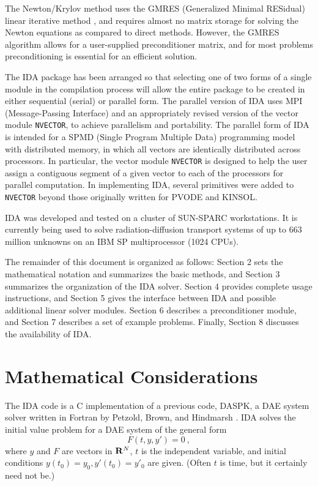 The Newton/Krylov method uses the GMRES (Generalized Minimal RESidual)
linear iterative method \cite{SaSc86}, and requires almost no matrix
storage for solving the Newton equations as compared to direct
methods.  However, the GMRES algorithm allows for a user-supplied
preconditioner matrix, and for most problems preconditioning is
essential for an efficient solution.

The IDA package has been arranged so that selecting one of two forms
of a single module in the compilation process will allow the entire
package to be created in either sequential (serial) or parallel form.
The parallel version of IDA uses MPI (Message-Passing Interface)
\cite{MPI} and an appropriately revised version of the vector module
{\tt NVECTOR}, to achieve parallelism and portability.  The parallel
form of IDA is intended for a SPMD (Single Program Multiple Data)
programming model with distributed memory, in which all vectors are
identically distributed across processors.  In particular, the vector
module {\tt NVECTOR} is designed to help the user assign a contiguous
segment of a given vector to each of the processors for parallel
computation.  In implementing IDA, several primitives were added to
{\tt NVECTOR} beyond those originally written for PVODE and KINSOL.

IDA was developed and tested on a cluster of SUN-SPARC
workstations.  It is currently being used to solve radiation-diffusion
transport systems of up to 663 million unknowns on an IBM SP multiprocessor 
(1024 CPUs).

The remainder of this document is organized as follows: Section 2 sets
the mathematical notation and summarizes the basic methods, and
Section 3 summarizes the organization of the IDA solver.  Section 4
provides complete usage instructions, and Section 5 gives the
interface between IDA and possible additional linear solver modules.
Section 6 describes a preconditioner module, and Section 7 describes a
set of example problems.  Finally, Section 8 discusses the
availability of IDA.


\section{Mathematical Considerations}

The IDA code is a C implementation of a previous code, DASPK, a DAE
system solver written in Fortran by Petzold, Brown, and Hindmarsh
\cite{BrHiPe94,BrCaPe96}.  IDA solves the initial value problem for 
a DAE system of the general form
\begin{equation}
  F(t,y,y') = 0 ~,    \label{DAEsys}
\end{equation}
where $y$ and $F$ are vectors in ${\bf R}^N$, $t$ is the independent
variable, and initial conditions $y(t_0) = y_0, y'(t_0) = y'_0$ are
given.  (Often $t$ is time, but it certainly need not be.)

